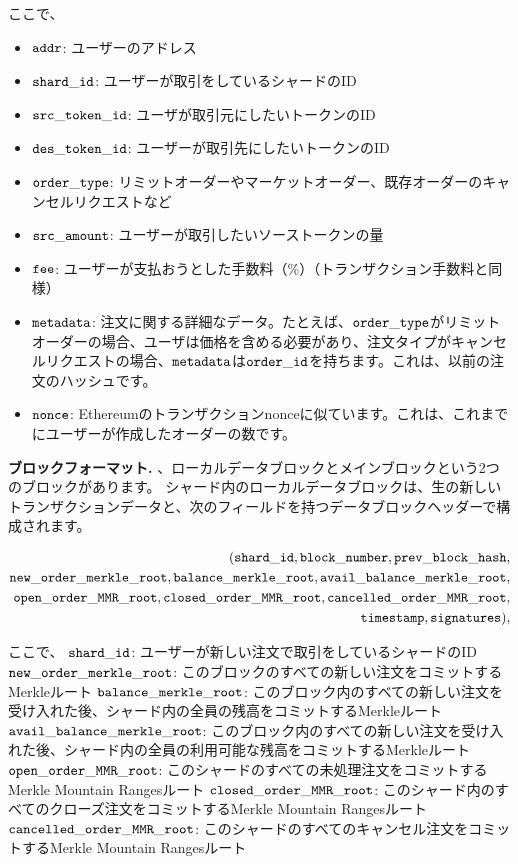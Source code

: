 ここで、
\begin{itemize}
\item ${\mathtt{addr}}$: ユーザーのアドレス
\item ${\mathtt{shard\_id}}$: ユーザーが取引をしているシャードのID
\item ${\mathtt{src\_token\_id}}$: ユーザが取引元にしたいトークンのID
\item ${\mathtt{des\_token\_id}}$: ユーザーが取引先にしたいトークンのID
\item ${\mathtt{order\_type}}$: リミットオーダーやマーケットオーダー、既存オーダーのキャンセルリクエストなど
\item ${\mathtt{src\_amount}}$: ユーザーが取引したいソーストークンの量
\item ${\mathtt{fee}}$: ユーザーが支払おうとした手数料（\%）（トランザクション手数料と同様）
\item ${\mathtt{metadata}}$: 注文に関する詳細なデータ。たとえば、${\mathtt{order\_type}}$がリミットオーダーの場合、ユーザは価格を含める必要があり、注文タイプがキャンセルリクエストの場合、${\mathtt{metadata}}$は${\mathtt{order\_id}}$を持ちます。これは、以前の注文のハッシュです。
\item ${\mathtt{nonce}}$: Ethereumのトランザクションnonceに似ています。これは、これまでにユーザーが作成したオーダーの数です。
\end{itemize}

\textbf{ブロックフォーマット.} 、ローカルデータブロックとメインブロックという2つのブロックがあります。 シャード内のローカルデータブロックは、生の新しいトランザクションデータと、次のフィールドを持つデータブロックヘッダーで構成されます。

\begin{align*}
({\mathtt{shard\_id}}, {\mathtt{block\_number}}, {\mathtt{prev\_block\_hash}},\\ {\mathtt{new\_order\_merkle\_root}}, {\mathtt{balance\_merkle\_root}}, {\mathtt{avail\_balance\_merkle\_root}},\\ {\mathtt{open\_order\_MMR\_root}}, {\mathtt{closed\_order\_MMR\_root}}, {\mathtt{cancelled\_order\_MMR\_root}},\\ {\mathtt{timestamp}}, {\mathtt{signatures}}),
\end{align*}

ここで、
${\mathtt{shard\_id}}$: ユーザーが新しい注文で取引をしているシャードのID 
${\mathtt{new\_order\_merkle\_root}}$: このブロックのすべての新しい注文をコミットするMerkleルート
${\mathtt{balance\_merkle\_root}}$: このブロック内のすべての新しい注文を受け入れた後、シャード内の全員の残高をコミットするMerkleルート  
${\mathtt{avail\_balance\_merkle\_root}}$: このブロック内のすべての新しい注文を受け入れた後、シャード内の全員の利用可能な残高をコミットするMerkleルート
${\mathtt{open\_order\_MMR\_root}}$: このシャードのすべての未処理注文をコミットするMerkle Mountain Rangesルート
${\mathtt{closed\_order\_MMR\_root}}$: このシャード内のすべてのクローズ注文をコミットするMerkle Mountain Rangesルート
${\mathtt{cancelled\_order\_MMR\_root}}$: このシャードのすべてのキャンセル注文をコミットするMerkle Mountain Rangesルート 

